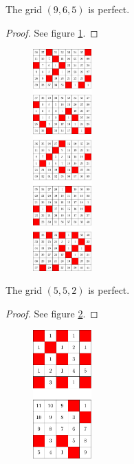 \begin{con}
\label{con:9x6x5}
The grid $(9,6,5)$ is perfect.
\end{con}

\begin{proof}
See figure \ref{fig:6x9x5_numbered_heatmap}.
\end{proof}

\begin{figure}[]
\centering
\includegraphics[width=0.2\textwidth]{figures/A/6x9x5_numbered_heatmap.pdf}
\caption{}
\label{fig:6x9x5_numbered_heatmap}
\end{figure}

\begin{con}
\label{con:5x5x2}
The grid $(5,5,2)$ is perfect.
\end{con}

\begin{proof}
See figure \ref{fig:5x5x2_numbered_heatmap}.
\end{proof}

\begin{figure}[]
\centering
\includegraphics[width=0.2\textwidth]{figures/A/5x5x2_numbered_heatmap.pdf}
\caption{}
\label{fig:5x5x2_numbered_heatmap}
\end{figure}

